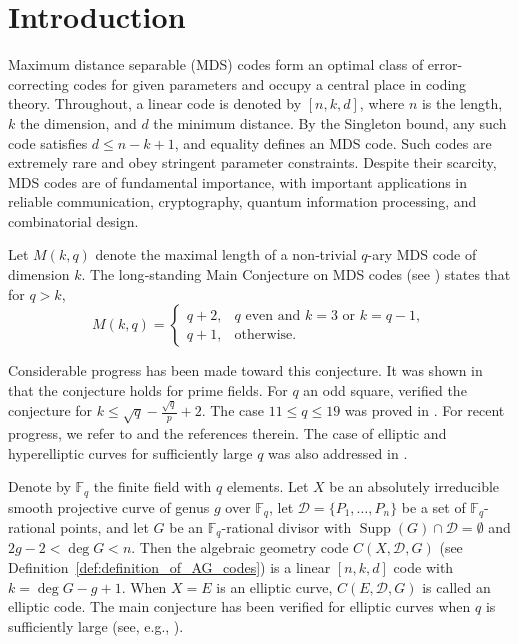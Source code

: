 \documentclass[journal,12pt,onecolumn]{IEEEtran}
\begin{document}
\section{Introduction}
Maximum distance separable (MDS) codes form an optimal class of error-correcting codes for given parameters and occupy a central place in coding theory. Throughout, a linear code is denoted by $[n,k,d]$, where $n$ is the length, $k$ the dimension, and $d$ the minimum distance. By the Singleton bound, any such code satisfies $d \le n-k+1$, and equality defines an MDS code. Such codes are extremely rare and obey stringent parameter constraints. Despite their scarcity, MDS codes are of fundamental importance, with important applications in reliable communication, cryptography, quantum information processing, and combinatorial design.


Let $M(k,q)$ denote the maximal length of a non‑trivial $q$-ary MDS code of dimension $k$. The long‑standing Main Conjecture on MDS codes (see \cite{MR465509}) states that for $q>k$, 
\[
M(k,q)=\begin{cases}
q+2, & q\text{ even and }k=3\text{ or }k=q-1,\\
q+1, & \text{otherwise}.
\end{cases}
\]

Considerable progress has been made toward this conjecture. It was shown in \cite{MR2911882} that the conjecture holds for prime fields. For $q$ an odd square, \cite{MR3846204,MR4073887} verified the conjecture for $k\le \sqrt{q} - \frac{\sqrt{q}}{p} + 2$. The case $11\le q\le 19$ was proved in \cite{MR1477225}. For recent progress, we refer to \cite{MR1398077,MR985681,MR1198385} and the references therein. The case of elliptic and hyperelliptic curves for sufficiently large $q$ was also addressed in \cite{MR1178199,MR1412183,MR1289576,MR1454971}.

Denote by $\mathbb{F}_q$ the finite field with $q$ elements.
Let $X$ be an absolutely irreducible smooth projective curve of genus $g$ over $\mathbb{F}_q$, let $\mathcal{D}=\{P_1,\dots,P_n\}$ be a set of $\mathbb{F}_q$-rational points, and let $G$ be an $\mathbb{F}_q$-rational divisor with $\operatorname{Supp}(G)\cap\mathcal{D}=\emptyset$ and $2g-2<\deg G<n$. Then the algebraic geometry code $C(X,\mathcal{D},G)$ (see Definition~\ref{def:definition_of_AG_codes}) is a linear $[n,k,d]$ code with $k=\deg G-g+1$. When $X=E$ is an elliptic curve, $C(E,\mathcal{D},G)$ is called an elliptic code. The main conjecture has been verified for elliptic curves when $q$ is sufficiently large (see, e.g., \cite{MR1178199,MR1412183}).
\end{document}
